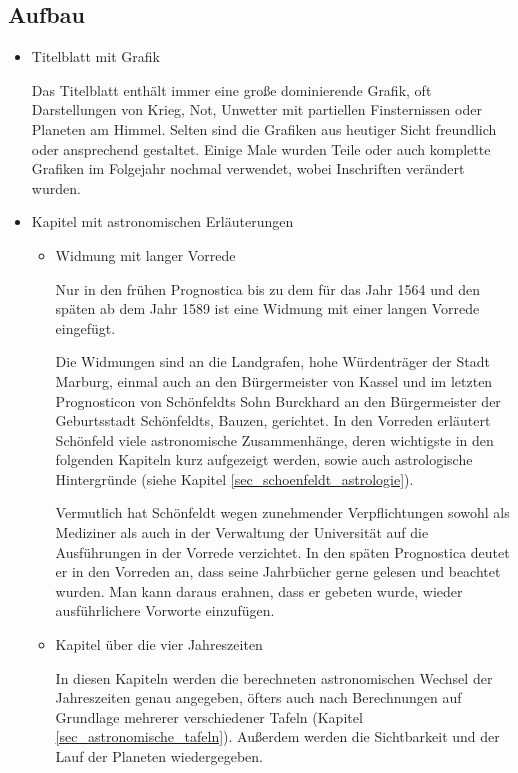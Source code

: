 \documentclass[12pt]{article}
\begin{document}
\subsection{Aufbau}
\begin{itemize}
	\item Titelblatt mit Grafik
	
	Das Titelblatt enthält immer eine große dominierende Grafik, oft Darstellungen von Krieg, Not, Unwetter mit partiellen Finsternissen oder Planeten am Himmel. Selten sind die Grafiken aus heutiger Sicht freundlich oder ansprechend gestaltet. Einige Male wurden Teile oder auch komplette Grafiken im Folgejahr nochmal verwendet, wobei Inschriften verändert wurden.
	
	\item Kapitel mit astronomischen Erläuterungen
	\begin{itemize}
		\item Widmung mit langer Vorrede
		
		Nur in den frühen Prognostica bis zu dem für das Jahr 1564 und den späten ab dem Jahr 1589 ist eine Widmung mit einer langen Vorrede eingefügt.
		
		Die Widmungen sind an die Landgrafen, hohe Würdenträger der Stadt Marburg, einmal auch an den Bürgermeister von Kassel und im letzten Prognosticon von Schönfeldts Sohn Burckhard an den Bürgermeister der Geburtsstadt Schönfeldts, Bauzen, gerichtet. In den Vorreden erläutert Schönfeld viele astronomische Zusammenhänge, deren wichtigste in den folgenden Kapiteln kurz aufgezeigt werden, sowie auch astrologische Hintergründe (siehe Kapitel \ref{sec_schoenfeldt_astrologie}).
		
		Vermutlich hat Schönfeldt wegen zunehmender Verpflichtungen sowohl als Mediziner als auch in der Verwaltung der Universität auf die Ausführungen in der Vorrede verzichtet. In den späten Prognostica deutet er in den Vorreden an, dass seine Jahrbücher gerne gelesen und beachtet wurden. Man kann daraus erahnen, dass er gebeten wurde, wieder ausführlichere Vorworte einzufügen.
		
		\item Kapitel über die vier Jahreszeiten
		
		In diesen Kapiteln werden die berechneten astronomischen Wechsel der Jahreszeiten genau angegeben, öfters auch nach Berechnungen auf Grundlage mehrerer verschiedener Tafeln (Kapitel \ref{sec_astronomische_tafeln}). Außerdem werden die Sichtbarkeit und der Lauf der Planeten wiedergegeben.
		

\end{itemize}
\end{itemize}
\end{document}
